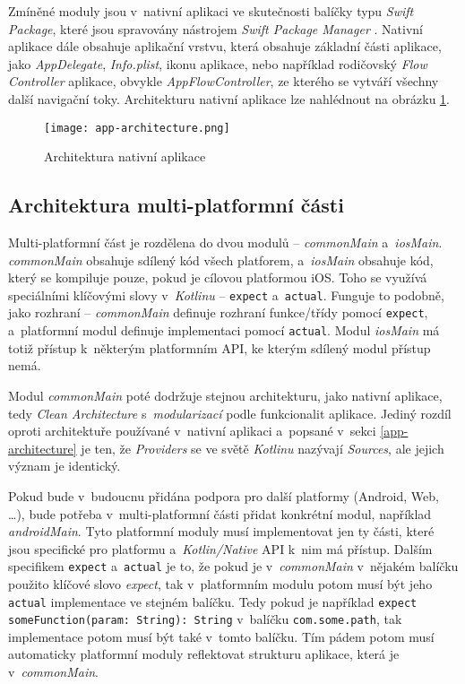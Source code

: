 Zmíněné moduly jsou v~nativní aplikaci ve skutečnosti balíčky typu \emph{Swift Package}, které jsou spravovány nástrojem \emph{Swift Package Manager} \cite{spm}. Nativní aplikace dále obsahuje aplikační vrstvu, která obsahuje základní části aplikace, jako \emph{AppDelegate}, \emph{Info.plist}, ikonu aplikace, nebo například rodičovský \emph{Flow Controller} aplikace, obvykle \emph{AppFlowController}, ze kterého se vytváří všechny další navigační toky. Architekturu nativní aplikace lze nahlédnout na obrázku \ref{fig:app-architecture}.

\begin{figure}[h]
	\centering
	\texttt{[image: app-architecture.png]}
	\caption{Architektura nativní aplikace}
	\label{fig:app-architecture}
\end{figure}

\subsection{Architektura multi-platformní části}

Multi-platformní část je rozdělena do dvou modulů – \emph{commonMain} a~\emph{iosMain}. \emph{commonMain} obsahuje sdílený kód všech platforem, a~\emph{iosMain} obsahuje kód, který se kompiluje pouze, pokud je cílovou platformou iOS. Toho se využívá speciálními klíčovými slovy v~\emph{Kotlinu} – \texttt{expect} a~\texttt{actual}. Funguje to podobně, jako rozhraní – \emph{commonMain} definuje rozhraní funkce/třídy pomocí \texttt{expect}, a~platformní modul definuje implementaci pomocí \texttt{actual}. Modul \emph{iosMain} má totiž přístup k~některým platformním API, ke kterým sdílený modul přístup nemá.

Modul \emph{commonMain} poté dodržuje stejnou architekturu, jako nativní aplikace, tedy \emph{Clean Architecture} s~\emph{modularizací} podle funkcionalit aplikace. Jediný rozdíl oproti architektuře používané v~nativní aplikaci a~popsané v~sekci \ref{app-architecture} je ten, že \emph{Providers} se ve světě \emph{Kotlinu} nazývají \emph{Sources}, ale jejich význam je identický.

Pokud bude v~budoucnu přidána podpora pro další platformy (Android, Web, \dots), bude potřeba v~multi-platformní části přidat konkrétní modul, například \emph{androidMain}. Tyto platformní moduly musí implementovat jen ty části, které jsou specifické pro platformu a~\emph{Kotlin/Native} API k~nim má přístup. Dalším specifikem \texttt{expect} a~\texttt{actual} je to, že pokud je v~\emph{commonMain} v~nějakém balíčku použito klíčové slovo \emph{expect}, tak v~platformním modulu potom musí být jeho \texttt{actual} implementace ve stejném balíčku. Tedy pokud je například \texttt{expect someFunction(param: String): String} v~balíčku \texttt{com.some.path}, tak implementace potom musí být také v~tomto balíčku. Tím pádem potom musí automaticky platformní moduly reflektovat strukturu aplikace, která je v~\emph{commonMain}.

